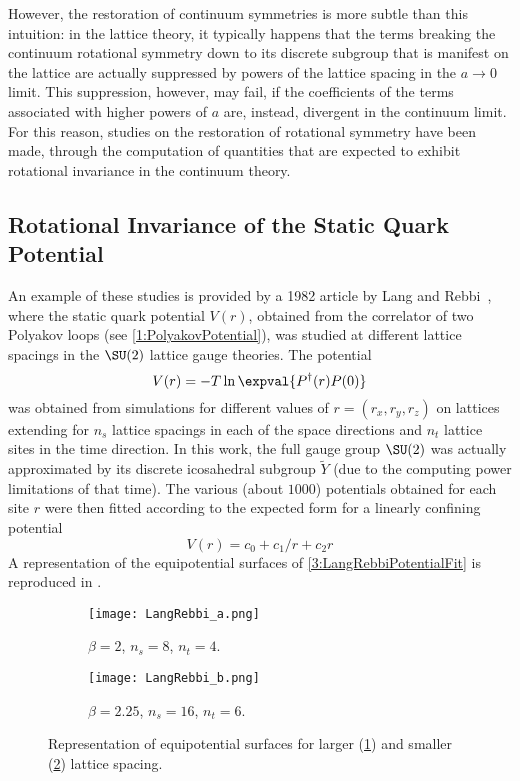 However, the restoration of continuum symmetries is more subtle than this intuition: in the lattice theory, it typically happens that the terms breaking the continuum rotational symmetry down to its discrete subgroup that is manifest on the lattice are actually suppressed by powers of the lattice spacing in the $a\to 0$ limit.
This suppression, however, may fail, if the coefficients of the terms associated with higher powers of $a$ are, instead, divergent in the continuum limit. For this reason, studies on the restoration of rotational symmetry have been made, through the computation of quantities that are expected to exhibit rotational invariance in the continuum theory.

\subsection{Rotational Invariance of the Static Quark Potential\label{Sec3:RotInv}}
An example of these studies is provided by a 1982 article by Lang and Rebbi~\cite{Lang:1982tj}, where the static quark potential $V(r)$, obtained from the correlator of two Polyakov loops (see \eqref{1:PolyakovPotential}), was studied at different lattice spacings in the $\SU(2)$ lattice gauge theories. The potential
\begin{equation}
    V(r) = -T\ln\expval{P^\dagger(r)P(0)} \label{3:LangRebbiPotential}
\end{equation}
was obtained from simulations for different values of $r=(r_x, r_y, r_z)$ on lattices extending for $n_s$ lattice spacings in each of the space directions and $n_t$ lattice sites in the time direction.
In this work, the full gauge group $\SU(2)$ was actually approximated by its discrete icosahedral subgroup $\tilde{Y}$ (due to the computing power limitations of that time).
The various (about $1000$) potentials obtained for each site $r$ were then fitted according to the expected form for a linearly confining potential
\begin{equation}
    V(r) = c_0 + c_1/r + c_2r \label{3:LangRebbiPotentialFit}
\end{equation}
A representation of the equipotential surfaces of \eqref{3:LangRebbiPotentialFit} is reproduced in .
\begin{figure}[!htbp]
    \centering
    \hfill
    \begin{subfigure}[b]{0.45\textwidth}
        \centering
        \texttt{[image: LangRebbi\_a.png]}
        \caption{$\beta=2$, $n_s=8$, $n_t=4$.}
        \label{3F:LangRebbiA}
    \end{subfigure}
    \begin{subfigure}[b]{0.45\textwidth}
        \centering
        \texttt{[image: LangRebbi\_b.png]}
        \caption{$\beta=2.25$, $n_s=16$, $n_t=6$.}
        \label{3F:LangRebbiB}
    \end{subfigure}
    \hfill
    \caption{Representation of equipotential surfaces for larger (\ref{3F:LangRebbiA}) and smaller (\ref{3F:LangRebbiB}) lattice spacing.}
    \label{3F:LangRebbi}
\end{figure}\\
